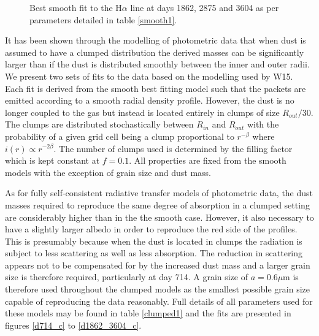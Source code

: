 \documentclass[useAMS,usenatbib,usegraphicx]{mnras}
\begin{document}
\begin{figure}
\begin{center}
\caption{Best smooth fit to the H$\alpha$ line at days 1862, 2875 and 3604 as per parameters detailed in table \ref{smooth1}.}
\label{d1862_3604}
\end{center}
\end{figure}



It has been shown through the modelling of photometric data that when dust is assumed to have a clumped distribution the derived masses can be significantly larger than if the dust is distributed smoothly between the inner and outer radii.  We present two sets of fits to the data based on the modelling used by W15.  Each fit is derived from the smooth best fitting model such that the packets are emitted according to a smooth radial density profile.  However, the dust is no longer coupled to the gas but instead is located entirely in clumps of size $R_{out}/30$.  The clumps are distributed stochastically between $R_{in}$ and $R_{out}$ with the probability of a given grid cell being a clump proportional to $r^{- \beta }$ where $i(r) \propto r^{-2 \beta}$.  The number of clumps used is determined by the filling factor which is kept constant at $f=0.1$.  All properties are fixed from the smooth models with the exception of grain size and dust mass.

As for fully self-consistent radiative transfer models of photometric data, the dust masses required to reproduce the same degree of absorption in a clumped setting are considerably higher than in the the smooth case.  However, it also necessary to have a slightly larger albedo in order to reproduce the red side of the profiles.  This is presumably because when the dust is located in clumps the radiation is subject to less scattering as well as less absorption.  The reduction in scattering appears not to be compensated for by the increased dust mass and a larger grain size is therefore required, particularly at day 714.  A grain size of $a=0.6\mu$m is therefore used throughout the clumped models as the smallest possible grain size capable of reproducing the data reasonably. Full details of all parameters used for these models may be found in table \ref{clumped1} and the fits are presented in figures \ref{d714_c} to \ref{d1862_3604_c}.
\end{document}
